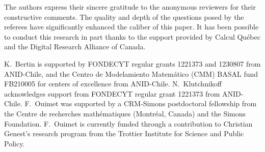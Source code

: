 \documentclass[bj,authoryear]{imsart}
\numberwithin{equation}{section}
\theoremstyle{plain}
\theoremstyle{remark}
\newcommand{\1}{\mathds{1}}
\begin{document}
\begin{acks}[Acknowledgments]
The authors express their sincere gratitude to the anonymous reviewers for their constructive comments. The quality and depth of the questions posed by the referees have significantly enhanced the caliber of this paper. It has been possible to conduct this research in part thanks to the support provided by Calcul Qu\'ebec and the Digital Research Alliance of Canada.
\end{acks}

\begin{funding}
K.\ Bertin is supported by FONDECYT regular grants 1221373 and 1230807 from ANID-Chile, and the Centro de Modelamiento Matemático (CMM) BASAL fund FB210005 for centers of excellence from ANID-Chile. N.\ Klutchnikoff acknowledges support from FONDECYT regular grant 1221373 from ANID-Chile. F.\ Ouimet was supported by a CRM-Simons postdoctoral fellowship from the Centre de recherches math\'ematiques (Montr\'eal, Canada) and the Simons Foundation. F.\ Ouimet is currently funded through a contribution to Christian Genest's research program from the Trottier Institute for Science and Public Policy.
\end{funding}






\begin{supplement}



\end{supplement}



\end{document}
